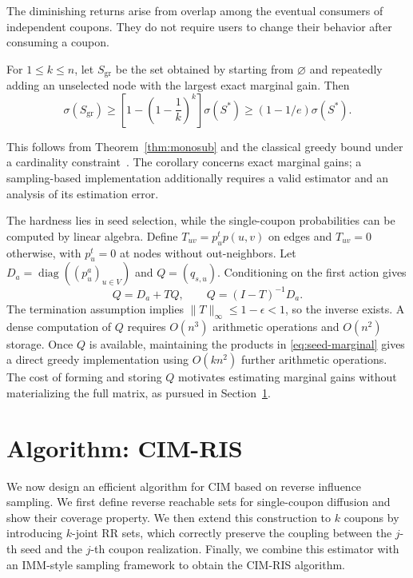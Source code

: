 \documentclass[sigconf]{acmart}
\newcommand{\CIMRIS}{\textsc{CIM-RIS}}
\begin{document}
The diminishing returns arise from overlap among the eventual
consumers of independent coupons. They do not require users to change
their behavior after consuming a coupon.

\begin{corollary}
\label{cor:exact-greedy}
For $1\leq k\leq n$, let $S_{\mathrm{gr}}$ be the set obtained by
starting from $\varnothing$ and repeatedly adding an unselected node
with the largest exact marginal gain. Then
\[
  \sigma(S_{\mathrm{gr}})
    \geq\left[1-\left(1-\frac{1}{k}\right)^k\right]\sigma(S^*)
    \geq(1-1/e)\sigma(S^*).
\]
\end{corollary}

This follows from Theorem~\ref{thm:monosub} and the classical greedy
bound under a cardinality constraint~\cite{nemhauser1978analysis}.
The corollary concerns exact marginal gains; a sampling-based
implementation additionally requires a valid estimator and an analysis
of its estimation error.

The hardness lies in seed selection, while the single-coupon
probabilities can be computed by linear algebra. Define
$T_{uv}=p_u^t p(u,v)$ on edges and $T_{uv}=0$ otherwise, with
$p_u^t=0$ at nodes without out-neighbors. Let
$D_a=\operatorname{diag}((p_u^a)_{u\in V})$ and $Q=(q_{s,u})$.
Conditioning on the first action gives
\begin{equation}
\label{eq:single-coupon-kernel}
  Q=D_a+TQ,\qquad Q=(I-T)^{-1}D_a.
\end{equation}
The termination assumption implies $\|T\|_\infty\leq1-\epsilon<1$,
so the inverse exists. A dense computation of $Q$ requires $O(n^3)$
arithmetic operations and $O(n^2)$ storage. Once $Q$ is available,
maintaining the products in \eqref{eq:seed-marginal} gives a direct
greedy implementation using $O(kn^2)$ further arithmetic operations.
The cost of forming and storing $Q$ motivates estimating marginal
gains without materializing the full matrix, as pursued in
Section~\ref{sec:algo}.

\section{Algorithm: \CIMRIS{}}
\label{sec:algo}

We now design an efficient algorithm for CIM based on reverse
influence sampling.
We first define reverse reachable sets for single-coupon diffusion and
show their coverage property.
We then extend this construction to $k$ coupons by introducing
$k$-joint RR sets, which correctly preserve the coupling between the
$j$-th seed and the $j$-th coupon realization.
Finally, we combine this estimator with an IMM-style sampling framework
to obtain the \CIMRIS{} algorithm.
\end{document}
